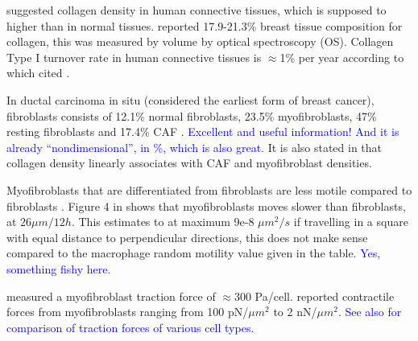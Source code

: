 \documentclass{article}
\newcommand{\LEK}[1]{\textcolor{blue}{#1}}
\begin{document}
    \cite{rutenberg2016uniform} suggested collagen density in human connective tissues, which is supposed to higher than in normal tissues. \cite{kehm2022comparison} reported 17.9-21.3\% breast tissue composition for collagen, this was measured by volume by optical spectroscopy (OS).
    Collagen Type I turnover rate in human connective tissues is $\approx$1\% per year according to \cite{hackenberg2020collagen} which cited \cite{verzijl2000effect}. 

    In ductal carcinoma in situ (considered the earliest form of breast cancer), fibroblasts consists of 12.1\% normal fibroblasts, 23.5\% myofibroblasts, 47\% resting fibroblasts and 17.4\% CAF \cite{risom2022transition}. \LEK{Excellent and useful information! And it is already ``nondimensional'', in \%, which is also great.} It is also stated in \cite{risom2022transition} that collagen density linearly associates with CAF and myofibroblast densities. 
    

    Myofibroblasts that are differentiated from fibroblasts are less motile compared to fibroblasts \cite{thampatty2007new}. Figure 4 in \cite{thampatty2007new} shows that myofibroblasts moves slower than fibroblasts, at $ 26\mu m/12 h$. This estimates to at maximum 9e-8 $\mu m^2/s$ if travelling in a square with equal distance to perpendicular directions, this does not make sense compared to the macrophage random motility value given in the table. \LEK{Yes, something fishy here.}

    \cite{chen2007alpha} measured a myofibroblast traction force of $\approx 300$ Pa/cell. \cite{yang2021quantitative} reported contractile forces from myofibroblasts ranging from 100 pN/$\mu m^2$ to 2 nN/$\mu m^2$. \LEK{See also \cite{zollinger2018dependence} for comparison of traction forces of various cell types.}
     
\end{document}
